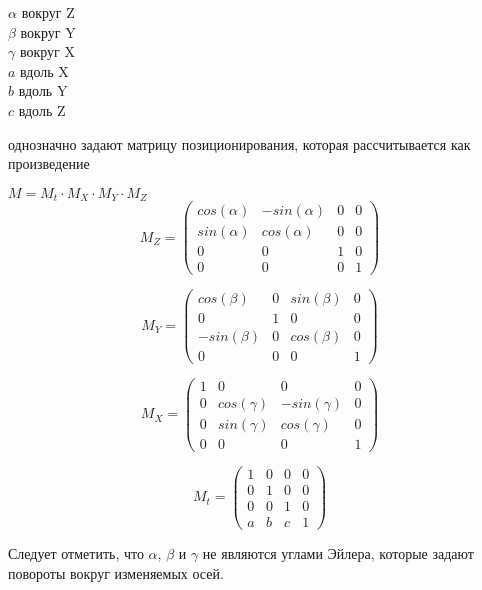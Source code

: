 {\centering
$\alpha$ вокруг Z \\
$\beta$ вокруг Y \\
$\gamma$ вокруг X \\
$a$ вдоль X \\
$b$ вдоль Y \\
$c$ вдоль Z \\
}

однозначно задают матрицу позиционирования, которая рассчитывается как произведение

{\centering
$M = M_t \cdot M_X \cdot M_Y \cdot M_Z$ \\

\[
M_Z=
\begin{pmatrix}
cos(\alpha) & -sin(\alpha) & 0 & 0 \\
sin(\alpha) & cos(\alpha) & 0 & 0 \\
0 & 0 & 1 & 0 \\
0 & 0 & 0 & 1
\end{pmatrix}
\]

\[
M_Y=
\begin{pmatrix}
cos(\beta) & 0 & sin(\beta) & 0 \\
0 & 1 & 0 & 0 \\
-sin(\beta) & 0 & cos(\beta) & 0 \\
0 & 0 & 0 & 1
\end{pmatrix}
\]

\[
M_X=
\begin{pmatrix}
1 & 0 & 0 & 0 \\
0 & cos(\gamma) & -sin(\gamma) & 0 \\
0 & sin(\gamma) & cos(\gamma) & 0  \\
0 & 0 & 0 & 1
\end{pmatrix}
\]

\[
M_t=
\begin{pmatrix}
1 & 0 & 0 & 0 \\
0 & 1 & 0 & 0 \\
0 & 0 & 1 & 0 \\
a & b & c & 1
\end{pmatrix}
\]

}

Следует отметить, что $\alpha$, $\beta$ и $\gamma$ не являются углами Эйлера, которые задают повороты вокруг изменяемых осей.
